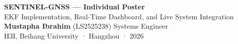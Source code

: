 \documentclass[20pt]{extarticle}
\begin{document}
\noindent
\begin{tcolorbox}[colback=buaaNavy,colframe=buaaNavy,boxrule=0pt,arc=8pt,
                  left=16pt,right=16pt,top=10pt,bottom=10pt]
  \begin{center}
    {\fontsize{46}{54}\bfseries\color{white} SENTINEL-GNSS — Individual Poster}\\[6pt]
    {\fontsize{26}{32}\color{buaaSky}
     EKF Implementation, Real-Time Dashboard, and Live System Integration}\\[8pt]
    {\large\color{white}
     \textbf{Mustapha Ibrahim} (LS2525238) \quad Systems Engineer}\\[4pt]
    {\normalsize\color{white!70!buaaSky} H3I, Beihang University · Hangzhou · 2026}
  \end{center}
\end{tcolorbox}
\vspace{0.5cm}
\end{document}
